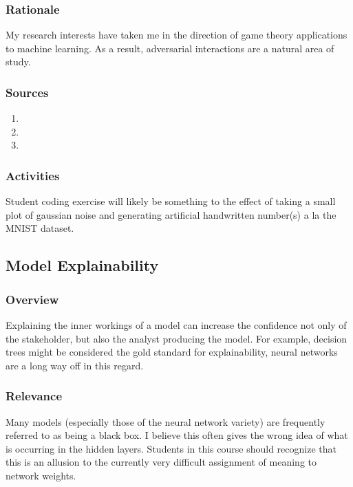 \documentclass[12pt]{amsart}
\begin{document}
\subsubsection{Rationale}
My research interests have taken me in the direction of game theory applications to machine learning.
As a result, adversarial interactions are a natural area of study.

\subsubsection{Sources}
\begin{enumerate}
	\item 
	\item 
	\item 
\end{enumerate}

\subsubsection{Activities}
Student coding exercise will likely be something to the effect of taking a small plot of gaussian noise
and generating artificial handwritten number(s) a la the MNIST dataset.



\subsection{Model Explainability}
\subsubsection{Overview}
Explaining the inner workings of a model can increase the confidence not only of the stakeholder,
but also the analyst producing the model. For example, decision trees might be considered the gold standard
for explainability, neural networks are a long way off in this regard.

\subsubsection{Relevance}
Many models (especially those of the neural network variety) are frequently referred to as being a black box. 
I believe this often gives the wrong idea of what is occurring in the hidden layers.
Students in this course should recognize that this is an allusion to the currently very difficult 
assignment of meaning to network weights.
\end{document}
